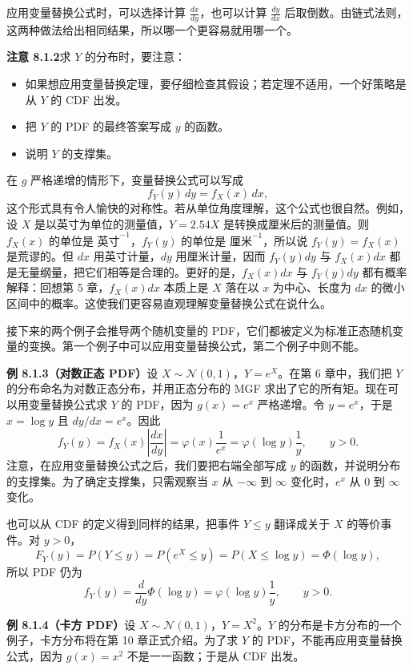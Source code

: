 \documentclass[UTF8, 12pt, fontset=fandol, oneside]{ctexart}
\begin{document}
应用变量替换公式时，可以选择计算 $\frac{dx}{dy}$，也可以计算 $\frac{dy}{dx}$ 后取倒数。由链式法则，这两种做法给出相同结果，所以哪一个更容易就用哪一个。

\noindent\textbf{注意 8.1.2}\quad 求 $Y$ 的分布时，要注意：
\begin{itemize}
  \item 如果想应用变量替换定理，要仔细检查其假设；若定理不适用，一个好策略是从 $Y$ 的 CDF 出发。
  \item 把 $Y$ 的 PDF 的最终答案写成 $y$ 的函数。
  \item 说明 $Y$ 的支撑集。
\end{itemize}

在 $g$ 严格递增的情形下，变量替换公式可以写成
\[
  f_Y(y)\,dy=f_X(x)\,dx,
\]
这个形式具有令人愉快的对称性。若从单位角度理解，这个公式也很自然。例如，设 $X$ 是以英寸为单位的测量值，$Y=2.54X$ 是转换成厘米后的测量值。则 $f_X(x)$ 的单位是 $\text{英寸}^{-1}$，$f_Y(y)$ 的单位是 $\text{厘米}^{-1}$，所以说 $f_Y(y)=f_X(x)$ 是荒谬的。但 $dx$ 用英寸计量，$dy$ 用厘米计量，因而 $f_Y(y)dy$ 与 $f_X(x)dx$ 都是无量纲量，把它们相等是合理的。更好的是，$f_X(x)dx$ 与 $f_Y(y)dy$ 都有概率解释：回想第 5 章，$f_X(x)dx$ 本质上是 $X$ 落在以 $x$ 为中心、长度为 $dx$ 的微小区间中的概率。这使我们更容易直观理解变量替换公式在说什么。

接下来的两个例子会推导两个随机变量的 PDF，它们都被定义为标准正态随机变量的变换。第一个例子中可以应用变量替换公式，第二个例子中则不能。

\noindent\textbf{例 8.1.3（对数正态 PDF）}\quad 设 $X\sim\mathcal N(0,1)$，$Y=e^X$。在第 6 章中，我们把 $Y$ 的分布命名为对数正态分布，并用正态分布的 MGF 求出了它的所有矩。现在可以用变量替换公式求 $Y$ 的 PDF，因为 $g(x)=e^x$ 严格递增。令 $y=e^x$，于是 $x=\log y$ 且 $dy/dx=e^x$。因此
\[
  f_Y(y)=f_X(x)\left|\frac{dx}{dy}\right|
  =\varphi(x)\frac{1}{e^x}
  =\varphi(\log y)\frac{1}{y},\qquad y>0.
\]
注意，在应用变量替换公式之后，我们要把右端全部写成 $y$ 的函数，并说明分布的支撑集。为了确定支撑集，只需观察当 $x$ 从 $-\infty$ 到 $\infty$ 变化时，$e^x$ 从 $0$ 到 $\infty$ 变化。

也可以从 CDF 的定义得到同样的结果，把事件 $Y\le y$ 翻译成关于 $X$ 的等价事件。对 $y>0$，
\[
  F_Y(y)=P(Y\le y)=P(e^X\le y)=P(X\le \log y)=\Phi(\log y),
\]
所以 PDF 仍为
\[
  f_Y(y)=\frac{d}{dy}\Phi(\log y)=\varphi(\log y)\frac{1}{y},\qquad y>0.
\]

\noindent\textbf{例 8.1.4（卡方 PDF）}\quad 设 $X\sim\mathcal N(0,1)$，$Y=X^2$。$Y$ 的分布是卡方分布的一个例子，卡方分布将在第 10 章正式介绍。为了求 $Y$ 的 PDF，不能再应用变量替换公式，因为 $g(x)=x^2$ 不是一一函数；于是从 CDF 出发。
\end{document}
